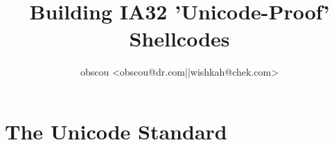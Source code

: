 

\title{ Building IA32 'Unicode-Proof' Shellcodes }
\author{ obscou <obscou@dr.com||wishkah@chek.com> }




\tableofcontents{}










\section{The Unicode Standard}










